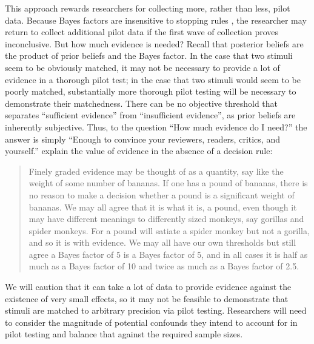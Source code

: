 \documentclass[fignum,nobf,man]{apa}
\begin{document}
This approach rewards researchers for collecting more, rather than less, pilot data. Because Bayes factors are insensitive to stopping rules \citep{Rouder, 2014}, the researcher may return to collect additional pilot data if the first wave of collection proves inconclusive. But how much evidence is needed? Recall that posterior beliefs are the product of prior beliefs and the Bayes factor. In the case that two stimuli seem to be obviously matched, it may not be necessary to provide a lot of evidence in a thorough pilot test; in the case that two stimuli would seem to be poorly matched, substantially more thorough pilot testing will be necessary to demonstrate their matchedness.  There can be no objective threshold that separates ``sufficient evidence'' from ``insufficient evidence'', as prior beliefs are inherently subjective. %
Thus, to the question ``How much evidence do I need?'' the answer is simply ``Enough to convince your reviewers, readers, critics, and yourself.'' \citet[p. 12]{Rouder:etal:submitted} %
explain the value of evidence in the absence of a decision rule: 
\begin{quote}
Finely graded evidence may be thought of as a quantity, say like the weight of some number of bananas. If one has a pound of bananas, there is no reason to make a decision whether a pound is a significant weight of bananas. We may all agree that it is what it is, a pound, even though it may have different meanings to differently sized monkeys, say gorillas and spider monkeys. For a pound will satiate a spider monkey but not a gorilla, and so it is with evidence. We may all have our own thresholds but still agree a Bayes factor of 5 is a Bayes factor of 5, and in all cases it is half as much as a Bayes factor of 10 and twice as much as a Bayes factor of 2.5.
\end{quote}

We will caution that it can take a lot of data to provide evidence against the existence of very small effects, so it may not be feasible to demonstrate that stimuli are matched to arbitrary precision via pilot testing. Researchers will need to consider the magnitude of potential confounds they intend to account for in pilot testing and balance that against the required sample sizes.
\end{document}
